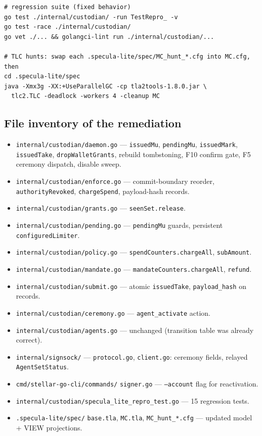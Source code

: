 \documentclass[11pt]{article}
\newcommand{\code}[1]{\texttt{#1}}
\newcommand{\file}[1]{\texttt{#1}}
\begin{document}
\begin{lstlisting}
# regression suite (fixed behavior)
go test ./internal/custodian/ -run TestRepro_ -v
go test -race ./internal/custodian/
go vet ./... && golangci-lint run ./internal/custodian/...

# TLC hunts: swap each .specula-lite/spec/MC_hunt_*.cfg into MC.cfg, then
cd .specula-lite/spec
java -Xmx3g -XX:+UseParallelGC -cp tla2tools-1.8.0.jar \
  tlc2.TLC -deadlock -workers 4 -cleanup MC
\end{lstlisting}

\subsection{File inventory of the remediation}

\begin{itemize}[nosep]
  \item \file{internal/custodian/daemon.go} — \code{issuedMu}, \code{pendingMu},
        \code{issuedMark}, \code{issuedTake}, \code{dropWalletGrants}, rebuild
        tombstoning, F10 confirm gate, F5 ceremony dispatch, disable sweep.
  \item \file{internal/custodian/enforce.go} — commit-boundary reorder,
        \code{authorityRevoked}, \code{chargeSpend}, payload-hash records.
  \item \file{internal/custodian/grants.go} — \code{seenSet.release}.
  \item \file{internal/custodian/pending.go} — \code{pendingMu} guards,
        persistent \code{configuredLimiter}.
  \item \file{internal/custodian/policy.go} — \code{spendCounters.chargeAll},
        \code{subAmount}.
  \item \file{internal/custodian/mandate.go} — \code{mandateCounters.chargeAll},
        \code{refund}.
  \item \file{internal/custodian/submit.go} — atomic \code{issuedTake},
        \code{payload\_hash} on records.
  \item \file{internal/custodian/ceremony.go} — \code{agent\_activate} action.
  \item \file{internal/custodian/agents.go} — unchanged (transition table was
        already correct).
  \item \file{internal/signsock/} — \code{protocol.go}, \code{client.go}:
        ceremony fields, relayed \code{AgentSetStatus}.
  \item \file{cmd/stellar-go-cli/commands/} \code{signer.go} —
        \code{--account} flag for reactivation.
  \item \file{internal/custodian/specula\_lite\_repro\_test.go} — 15
        regression tests.
  \item \file{.specula-lite/spec/} \code{base.tla}, \code{MC.tla},
        \code{MC\_hunt\_*.cfg} — updated model + VIEW projections.
\end{itemize}
\end{document}
